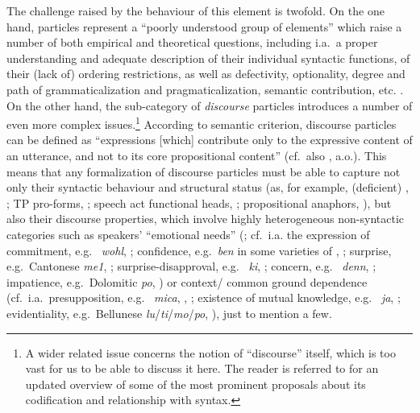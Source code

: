 \documentclass[output=paper]{langsci/langscibook}
\begin{document}
The challenge raised by the behaviour of this element is twofold. On the one
hand, particles represent a \enquote{poorly understood group of elements}
\parencite[387]{BibShee2011} which raise a number of both empirical and
theoretical questions, including i.a.\ a proper understanding and adequate
description of their individual syntactic functions, of their (lack of)
ordering restrictions, as well as defectivity, optionality, degree and path of
grammaticalization and pragmaticalization, semantic contribution, etc.
\parencite{BibShee2011,BibHaevanKem2014}. On the other hand, the sub-category
of \emph{discourse} particles introduces a number of even more complex
issues.\footnote{A wider related issue concerns the notion of \enquote{discourse}
    itself, which is too vast for us to be able to discuss it here.  The reader
    is referred to \citet{BayHinTro2015} for an updated overview of some of the
most prominent proposals about its codification and relationship with syntax.}
According to  semantic criterion, discourse
particles can be defined as \enquote{expressions [which] contribute only to the
expressive content of an utterance, and not to its core propositional content}
(cf.\ also \citealt[450]{BayObe2011}, a.o.). This means that any formalization
of discourse particles must be able to capture not only their syntactic
behaviour and structural status (as, for example, (deficient) ,
\citealt{Cardinaletti2011,Cardinaletti2015,Manzini2015}; TP pro-forms,
\citealt{HaeWei2015}; speech act functional heads,
\citealt{Haegeman2014,Hill2014}; propositional anaphors, \citealt{HinMun2015}), but also
their discourse properties, which involve highly heterogeneous non-syntactic
categories such as speakers’ \enquote{emotional needs} (\citealt{Gabelentz1969}; cf.\
i.a. the expression of commitment, e.g.\  \emph{wohl},
\citealt{Zimmermann2011}; confidence, e.g.\ \emph{ben} in some varieties of
\ili{Italian}, \citealt{Coniglio2008,Cardinaletti2011}; surprise, e.g.\ Cantonese
\emph{me1}, \citealt{Li2006}; surprise-disapproval, e.g.\ \ili{Bangla} \emph{ki},
\citealt{Bayer1996}; concern, e.g.\ \ili{German} \emph{denn}, \citealt{BayObe2011};
impatience, e.g.\ Dolomitic \ili{Ladin} \emph{po}, \citealt[52]{Hack2014}) or context\slash
common ground dependence (cf.\ i.a.\ presupposition, e.g.\ \ili{Italian}
\emph{mica}, \citealt{Cinque1976}, \citealt{Zanuttini1997}; existence of mutual
knowledge, e.g.\ \ili{German} \emph{ja}, \citealt{Zimmermann2011}; evidentiality,
e.g.\ Bellunese \emph{lu}/\emph{ti}/\emph{mo}/\emph{po}, \citealt{HinMun2015}),
just to mention a few.
\end{document}
